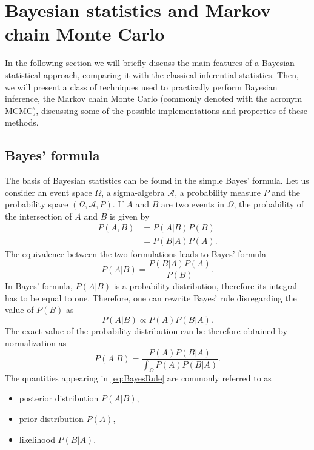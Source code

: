 \section{Bayesian statistics and Markov chain Monte Carlo}

In the following section we will briefly discuss the main features of a Bayesian statistical approach, comparing it with the classical inferential statistics. Then, we will present a class of techniques used to practically perform Bayesian inference, the Markov chain Monte Carlo (commonly denoted with the acronym MCMC), discussing some of the possible implementations and properties of these methods.
\subsection{Bayes' formula}
The basis of Bayesian statistics can be found in the simple Bayes' formula. Let us consider an event space $\Omega$, a sigma-algebra $\mathcal{A}$, a probability measure $P$ and the probability space $(\Omega, \mathcal{A}, P)$. If $A$ and $B$ are two events in $\Omega$, the probability of the intersection of $A$ and $B$ is given by
\begin{equation}
\begin{aligned}
	P(A, B) &= P(A|B)P(B) \\
	&= P(B|A)P(A).
\end{aligned}
\end{equation}
The equivalence between the two formulations leads to Bayes' formula
\begin{equation}\label{eq:BayesRule}
	P(A|B) = \frac{P(B|A)P(A)}{P(B)}.
\end{equation}
In Bayes' formula, $P(A|B)$ is a probability distribution, therefore its integral has to be equal to one. Therefore, one can rewrite Bayes' rule disregarding the value of $P(B)$ as
\begin{equation}
	P(A|B) \propto P(A)P(B|A).
\end{equation}
The exact value of the probability distribution can be therefore obtained by normalization as
\begin{equation}
	P(A|B) = \frac{P(A)P(B|A)}{\int_{\Omega}P(A)P(B|A)}.
\end{equation}
The quantities appearing in \eqref{eq:BayesRule} are commonly referred to as
\begin{itemize}
	\item posterior distribution $P(A|B)$,
	\item prior distribution $P(A)$,
	\item likelihood $P(B|A)$.
\end{itemize} 
